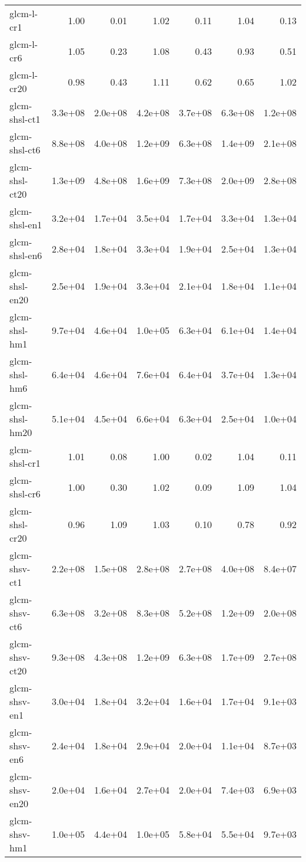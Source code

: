 \begin{tabular}{lrrrrrr}
glcm-l-cr1          &    1.00 &    0.01 &    1.02 &    0.11 &    1.04 &    0.13 \\
glcm-l-cr6          &    1.05 &    0.23 &    1.08 &    0.43 &    0.93 &    0.51 \\
glcm-l-cr20         &    0.98 &    0.43 &    1.11 &    0.62 &    0.65 &    1.02 \\
glcm-shsl-ct1       & 3.3e+08 & 2.0e+08 & 4.2e+08 & 3.7e+08 & 6.3e+08 & 1.2e+08 \\
glcm-shsl-ct6       & 8.8e+08 & 4.0e+08 & 1.2e+09 & 6.3e+08 & 1.4e+09 & 2.1e+08 \\
glcm-shsl-ct20      & 1.3e+09 & 4.8e+08 & 1.6e+09 & 7.3e+08 & 2.0e+09 & 2.8e+08 \\
glcm-shsl-en1       & 3.2e+04 & 1.7e+04 & 3.5e+04 & 1.7e+04 & 3.3e+04 & 1.3e+04 \\
glcm-shsl-en6       & 2.8e+04 & 1.8e+04 & 3.3e+04 & 1.9e+04 & 2.5e+04 & 1.3e+04 \\
glcm-shsl-en20      & 2.5e+04 & 1.9e+04 & 3.3e+04 & 2.1e+04 & 1.8e+04 & 1.1e+04 \\
glcm-shsl-hm1       & 9.7e+04 & 4.6e+04 & 1.0e+05 & 6.3e+04 & 6.1e+04 & 1.4e+04 \\
glcm-shsl-hm6       & 6.4e+04 & 4.6e+04 & 7.6e+04 & 6.4e+04 & 3.7e+04 & 1.3e+04 \\
glcm-shsl-hm20      & 5.1e+04 & 4.5e+04 & 6.6e+04 & 6.3e+04 & 2.5e+04 & 1.0e+04 \\
glcm-shsl-cr1       &    1.01 &    0.08 &    1.00 &    0.02 &    1.04 &    0.11 \\
glcm-shsl-cr6       &    1.00 &    0.30 &    1.02 &    0.09 &    1.09 &    1.04 \\
glcm-shsl-cr20      &    0.96 &    1.09 &    1.03 &    0.10 &    0.78 &    0.92 \\
glcm-shsv-ct1       & 2.2e+08 & 1.5e+08 & 2.8e+08 & 2.7e+08 & 4.0e+08 & 8.4e+07 \\
glcm-shsv-ct6       & 6.3e+08 & 3.2e+08 & 8.3e+08 & 5.2e+08 & 1.2e+09 & 2.0e+08 \\
glcm-shsv-ct20      & 9.3e+08 & 4.3e+08 & 1.2e+09 & 6.3e+08 & 1.7e+09 & 2.7e+08 \\
glcm-shsv-en1       & 3.0e+04 & 1.8e+04 & 3.2e+04 & 1.6e+04 & 1.7e+04 & 9.1e+03 \\
glcm-shsv-en6       & 2.4e+04 & 1.8e+04 & 2.9e+04 & 2.0e+04 & 1.1e+04 & 8.7e+03 \\
glcm-shsv-en20      & 2.0e+04 & 1.6e+04 & 2.7e+04 & 2.0e+04 & 7.4e+03 & 6.9e+03 \\
glcm-shsv-hm1       & 1.0e+05 & 4.4e+04 & 1.0e+05 & 5.8e+04 & 5.5e+04 & 9.7e+03 \\

\end{tabular}
